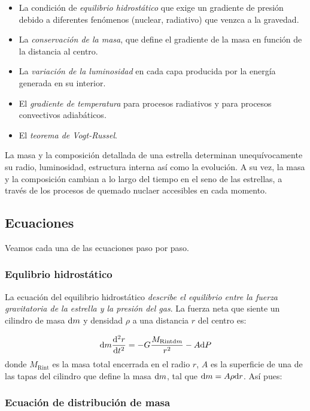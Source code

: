 \begin{itemize}
    \item La condición de \textit{equilibrio hidrostático} que exige un gradiente de presión debido a diferentes fenómenos (nuclear, radiativo) que venzca a la gravedad.
    \item La \textit{conservación de la masa}, que define el gradiente de la masa en función de la distancia al centro.
    \item La \textit{variación de la luminosidad} en cada capa producida por la energía generada en su interior. 
    \item El \textit{gradiente de temperatura} para procesos radiativos y para procesos convectivos adiabáticos.
    \item El \textit{teorema de Vogt-Russel}.
\end{itemize}
La masa y la composición detallada de una estrella determinan unequívocamente su radio, luminosidad, estructura interna así como la evolución. A su vez, la masa y la composición cambian a lo largo del tiempo en el seno de las estrellas, a través de los procesos de quemado nuclaer accesibles en cada momento.

\subsection{Ecuaciones}

Veamos cada una de las ecuaciones paso por paso.

\subsubsection{Equlibrio hidrostático}

La ecuación del equilibrio hidrostático \textit{describe el equilibrio entre la fuerza gravitatoria de la estrella y la presión del gas}. La fuerza neta que siente un cilindro de masa $\mathrm{d} m$ y densidad $\rho$ a una distancia $r$ del centro es:

\begin{equation}
    \mathrm{d} m \frac{\mathrm{d} ^2 r}{\mathrm{d} t^2} = - G \frac{M_{\text{Rint} \mathrm{d} m}}{r^2} - A \mathrm{d} P
\end{equation}
donde  $M_{\text{Rint}}$ es la masa total encerrada en el radio $r$, $A$  es la superficie de una de las tapas del cilindro que define la masa $\mathrm{d} m$, tal que $\mathrm{d} m = A \rho \mathrm{d} r$. Así pues:  


\subsubsection{Ecuación de distribución de masa }

